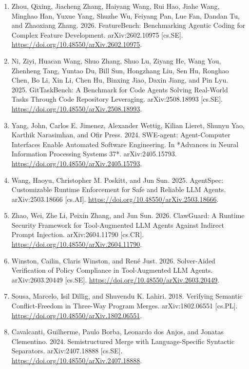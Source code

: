 \documentclass[9pt,letterpaper]{extarticle}
\begin{document}
\begin{enumerate}
\item \label{ref:33} Zhou, Qixing, Jiacheng Zhang, Haiyang Wang, Rui Hao, Jiahe Wang, Minghao Han, Yuxue Yang, Shuzhe Wu, Feiyang Pan, Lue Fan, Dandan Tu, and Zhaoxiang Zhang. 2026. {}FeatureBench: Benchmarking Agentic Coding for Complex Feature Development.{} arXiv:2602.10975 [cs.SE]. \url{https://doi.org/10.48550/arXiv.2602.10975}.
\item \label{ref:34} Ni, Ziyi, Huacan Wang, Shuo Zhang, Shuo Lu, Ziyang He, Wang You, Zhenheng Tang, Yuntao Du, Bill Sun, Hongzhang Liu, Sen Hu, Ronghao Chen, Bo Li, Xin Li, Chen Hu, Binxing Jiao, Daxin Jiang, and Pin Lyu. 2025. {}GitTaskBench: A Benchmark for Code Agents Solving Real-World Tasks Through Code Repository Leveraging.{} arXiv:2508.18993 [cs.SE]. \url{https://doi.org/10.48550/arXiv.2508.18993}.
\item \label{ref:35} Yang, John, Carlos E. Jimenez, Alexander Wettig, Kilian Lieret, Shunyu Yao, Karthik Narasimhan, and Ofir Press. 2024. {}SWE-agent: Agent-Computer Interfaces Enable Automated Software Engineering.{} In *Advances in Neural Information Processing Systems 37*. arXiv:2405.15793. \url{https://doi.org/10.48550/arXiv.2405.15793}.
\item \label{ref:36} Wang, Haoyu, Christopher M. Poskitt, and Jun Sun. 2025. {}AgentSpec: Customizable Runtime Enforcement for Safe and Reliable LLM Agents.{} arXiv:2503.18666 [cs.AI]. \url{https://doi.org/10.48550/arXiv.2503.18666}.
\item \label{ref:37} Zhao, Wei, Zhe Li, Peixin Zhang, and Jun Sun. 2026. {}ClawGuard: A Runtime Security Framework for Tool-Augmented LLM Agents Against Indirect Prompt Injection.{} arXiv:2604.11790 [cs.CR]. \url{https://doi.org/10.48550/arXiv.2604.11790}.
\item \label{ref:38} Winston, Cailin, Claris Winston, and René Just. 2026. {}Solver-Aided Verification of Policy Compliance in Tool-Augmented LLM Agents.{} arXiv:2603.20449 [cs.SE]. \url{https://doi.org/10.48550/arXiv.2603.20449}.
\item \label{ref:39} Sousa, Marcelo, Isil Dillig, and Shuvendu K. Lahiri. 2018. {}Verifying Semantic Conflict-Freedom in Three-Way Program Merges.{} arXiv:1802.06551 [cs.PL]. \url{https://doi.org/10.48550/arXiv.1802.06551}.
\item \label{ref:40} Cavalcanti, Guilherme, Paulo Borba, Leonardo dos Anjos, and Jonatas Clementino. 2024. {}Semistructured Merge with Language-Specific Syntactic Separators.{} arXiv:2407.18888 [cs.SE]. \url{https://doi.org/10.48550/arXiv.2407.18888}.

\end{enumerate}
\end{document}
